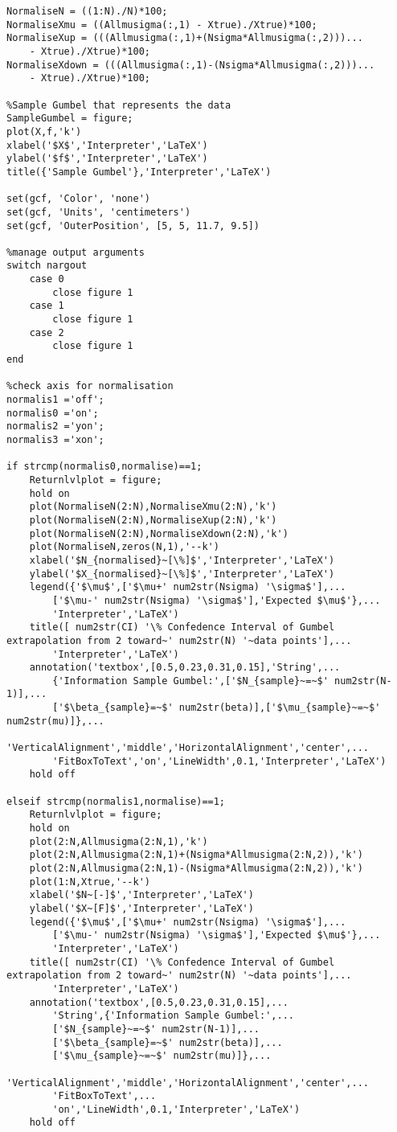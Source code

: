 \begin{lstlisting}
NormaliseN = ((1:N)./N)*100;
NormaliseXmu = ((Allmusigma(:,1) - Xtrue)./Xtrue)*100;
NormaliseXup = (((Allmusigma(:,1)+(Nsigma*Allmusigma(:,2)))...
    - Xtrue)./Xtrue)*100;
NormaliseXdown = (((Allmusigma(:,1)-(Nsigma*Allmusigma(:,2)))...
    - Xtrue)./Xtrue)*100;

%Sample Gumbel that represents the data
SampleGumbel = figure;
plot(X,f,'k')             
xlabel('$X$','Interpreter','LaTeX')
ylabel('$f$','Interpreter','LaTeX')
title({'Sample Gumbel'},'Interpreter','LaTeX') 

set(gcf, 'Color', 'none')
set(gcf, 'Units', 'centimeters')
set(gcf, 'OuterPosition', [5, 5, 11.7, 9.5])

%manage output arguments
switch nargout
    case 0
        close figure 1
    case 1
        close figure 1
    case 2
        close figure 1
end

%check axis for normalisation
normalis1 ='off';
normalis0 ='on';
normalis2 ='yon';
normalis3 ='xon';

if strcmp(normalis0,normalise)==1;   
    Returnlvlplot = figure;
    hold on
    plot(NormaliseN(2:N),NormaliseXmu(2:N),'k')
    plot(NormaliseN(2:N),NormaliseXup(2:N),'k')
    plot(NormaliseN(2:N),NormaliseXdown(2:N),'k')
    plot(NormaliseN,zeros(N,1),'--k')
    xlabel('$N_{normalised}~[\%]$','Interpreter','LaTeX')
    ylabel('$X_{normalised}~[\%]$','Interpreter','LaTeX')
    legend({'$\mu$',['$\mu+' num2str(Nsigma) '\sigma$'],...
        ['$\mu-' num2str(Nsigma) '\sigma$'],'Expected $\mu$'},...
        'Interpreter','LaTeX')
    title([ num2str(CI) '\% Confedence Interval of Gumbel extrapolation from 2 toward~' num2str(N) '~data points'],...
        'Interpreter','LaTeX')
    annotation('textbox',[0.5,0.23,0.31,0.15],'String',...
        {'Information Sample Gumbel:',['$N_{sample}~=~$' num2str(N-1)],...
        ['$\beta_{sample}=~$' num2str(beta)],['$\mu_{sample}~=~$' num2str(mu)]},...
        'VerticalAlignment','middle','HorizontalAlignment','center',...
        'FitBoxToText','on','LineWidth',0.1,'Interpreter','LaTeX')
    hold off

elseif strcmp(normalis1,normalise)==1;
    Returnlvlplot = figure;
    hold on
    plot(2:N,Allmusigma(2:N,1),'k')
    plot(2:N,Allmusigma(2:N,1)+(Nsigma*Allmusigma(2:N,2)),'k')
    plot(2:N,Allmusigma(2:N,1)-(Nsigma*Allmusigma(2:N,2)),'k')
    plot(1:N,Xtrue,'--k')
    xlabel('$N~[-]$','Interpreter','LaTeX')
    ylabel('$X~[F]$','Interpreter','LaTeX')
    legend({'$\mu$',['$\mu+' num2str(Nsigma) '\sigma$'],...
        ['$\mu-' num2str(Nsigma) '\sigma$'],'Expected $\mu$'},...
        'Interpreter','LaTeX')
    title([ num2str(CI) '\% Confedence Interval of Gumbel extrapolation from 2 toward~' num2str(N) '~data points'],...
        'Interpreter','LaTeX')
    annotation('textbox',[0.5,0.23,0.31,0.15],...
        'String',{'Information Sample Gumbel:',...
        ['$N_{sample}~=~$' num2str(N-1)],...
        ['$\beta_{sample}=~$' num2str(beta)],...
        ['$\mu_{sample}~=~$' num2str(mu)]},...
        'VerticalAlignment','middle','HorizontalAlignment','center',...
        'FitBoxToText',...
        'on','LineWidth',0.1,'Interpreter','LaTeX')
    hold off
    

\end{lstlisting}
